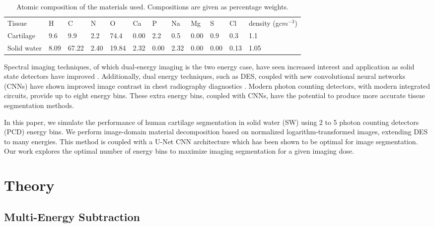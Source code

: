 \documentclass[a4paper,11pt]{article}
\begin{document}
\begin{table}[!hb]
\centering
\caption{Atomic composition of the materials used. Compositions are given as percentage weights.}
\begin{tabular}{llllllllllll}
Tissue      & H    & C     & N    & O     & Ca   & P    & Na   & Mg   & S    & Cl   & density (g$cm^{-3}$) \\
Cartilage   & 9.6  & 9.9   & 2.2  & 74.4  & 0.00 & 2.2  & 0.5  & 0.00 & 0.9  & 0.3  & 1.1         \\
Solid water & 8.09 & 67.22 & 2.40 & 19.84 & 2.32 & 0.00 & 2.32 & 0.00 & 0.00 & 0.13 & 1.05        \\
\end{tabular}
\end{table}


Spectral imaging techniques, of which dual-energy imaging is the two energy case, have seen increased interest and application as solid state detectors have improved \cite{Iniewski2014CZTImaging}. Additionally, dual energy techniques, such as DES, coupled with new convolutional neural networks (CNNs) have shown improved image contrast in chest radiography diagnostics \cite{ShengChen2014SeparationSmoothing, LOOG2006FilterRadiographs, Suzuki2004SuppressionNetwork, Yang2015EvaluationIrradiation}. Modern photon counting detectors, with modern integrated circuits, provide up to eight energy bins. These extra energy bins, coupled with CNNs, have the potential to produce more accurate tissue segmentation methods. 

In this paper, we simulate the performance of human cartilage segmentation in solid water (SW) using 2 to 5 photon counting detectors (PCD) energy bins. We perform image-domain material decomposition based on normalized logarithm-transformed images, extending DES to many energies. This method is coupled with a U-Net CNN architecture \cite{Ronneberger2015U-Net:Segmentation} which has been shown to be optimal for image segmentation. Our work explores the optimal number of energy bins to maximize imaging segmentation for a given imaging dose.

\section{Theory}

\subsection{Multi-Energy Subtraction}
\end{document}
